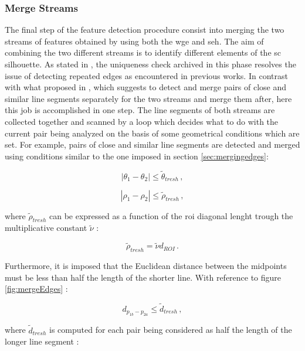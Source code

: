 \subsubsection{Merge Streams}
The final step of  the feature detection procedure consist into merging the two streams of features obtained by using both the \acrshort{wge} and \acrshort{seh}. The aim of combining the two different streams is to identify different elements of the \acrshort{sc} silhouette. As stated in \cite{Sharma2018}, the uniqueness check archived in this phase resolves the issue of detecting repeated edges as encountered in previous works.
In contrast with what proposed in \cite{Sharma2018}, which suggests to detect and merge pairs of close and similar line segments separately for the two streams and merge them after, here this job is accomplished in one step. The line segments of both streams are collected together and scanned by a loop which decides what to do with the current pair being analyzed on the basis of some geometrical conditions which are set.
For example, pairs of close and similar line segments are detected and merged using conditions similar to the one imposed in section \ref{sec:mergingedges}:

\begin{equation}
  |\theta_1 - \theta_2| \leqslant \tilde{\theta}_{tresh} \,,
\end{equation}

\begin{equation}
  |\rho_1 - \rho_2| \leqslant \tilde{\rho}_{tresh} \,,
\end{equation}

where $\tilde{\rho}_{tresh}$ can be expressed as a function of the \acrshort{roi} diagonal lenght trough the multiplicative constant $\tilde{\nu}$ \cite{fracchio2019}:

\begin{equation}
  \tilde{\rho}_{tresh} = \tilde{\nu} d_{ROI} \,.
\end{equation}

Furthermore, it is imposed that the Euclidean distance between the midpoints must be less than half the length of the shorter line. With reference to figure \ref{fig:mergeEdges} :

\begin{equation}
  d_{p_{1b}-p_{2a}} \leqslant \tilde{d}_{tresh} \,,
\end{equation}

where $\tilde{d}_{tresh}$ is computed for each pair being considered as half the length of the longer line segment :

